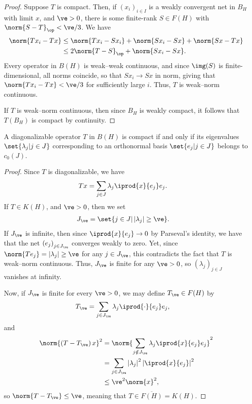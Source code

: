 \documentclass[10pt]{mypackage}
\begin{document}
\begin{proof}
  Suppose $T$ is compact. Then, if $\left( x_{i} \right)_{i\in I}$ is a weakly convergent net in $B_H$ with limit $x$, and $\ve > 0$, there is some finite-rank $S\in F(H)$ with $\norm{S-T}_{\op} < \ve/3$. We have
  \begin{align*}
    \norm{Tx_i - Tx} &\leq \norm{Tx_i - Sx_i} + \norm{Sx_i - Sx} + \norm{Sx - Tx}\\
                     &\leq 2\norm{T-S}_{\op} + \norm{Sx_i - Sx}.
  \end{align*}
  Every operator in $B(H)$ is weak--weak continuous, and since $\img(S)$ is finite-dimensional, all norms coincide, so that $Sx_i \rightarrow Sx$ in norm, giving that $\norm{Tx_i -Tx} < \ve/3$ for sufficiently large $i$. Thus, $T$ is weak--norm continuous.

  If $T$ is weak--norm continuous, then since $B_H$ is weakly compact, it follows that $T\left(B_H\right)$ is compact by continuity.
\end{proof}
\begin{lemma}
  A diagonalizable operator $T$ in $B(H)$ is compact if and only if its eigenvalues $\set{\lambda_j | j\in J}$ corresponding to an orthonormal basis $\set{e_j | j\in J}$ belongs to $c_0(J)$.
\end{lemma}
\begin{proof}
  Since $T$ is diagonalizable, we have
  \begin{align*}
    Tx &= \sum_{j\in J}\lambda_j \iprod{x}{e_j}e_j.
  \end{align*}
  If $T\in K(H)$, and $\ve > 0$, then we set
  \begin{align*}
    J_{\ve} &= \set{j\in J | \left\vert \lambda_j \right\vert \geq \ve}.
  \end{align*}
  If $J_{\ve}$ is infinite, then since $ \iprod{x}{e_j} \rightarrow 0 $ by Parseval's identity, we have that the net $\left( e_j \right)_{j\in J_{\ve}}$ converges weakly to zero. Yet, since $\norm{Te_j} = \left\vert \lambda_j \right\vert \geq \ve$ for any $j\in J_{\ve}$, this contradicts the fact that $T$ is weak--norm continuous. Thus, $J_{\ve}$ is finite for any $\ve > 0$, so $\left( \lambda_j \right)_{j\in J}$ vanishes at infinity.

  Now, if $J_{\ve}$ is finite for every $\ve > 0$, we may define $T_{\ve}\in F(H)$ by
  \begin{align*}
    T_{\ve} &= \sum_{j\in J_{\ve}}\lambda_j \iprod{\cdot}{e_j}e_j,
  \end{align*}
  and
  \begin{align*}
    \norm{\left( T-T_{\ve} \right)x}^2 &= \norm{\sum_{j\notin J_{\ve}} \lambda_j \iprod{x}{e_j}e_j}^2\\
                                       &= \sum_{j\in J_{\ve}} \left\vert \lambda_j \right\vert^2 \left\vert \iprod{x}{e_j} \right\vert^2\\
                                       &\leq \ve^2\norm{x}^2,
  \end{align*}
  so $\norm{T-T_{\ve}} \leq \ve$, meaning that $T\in \overline{F(H)} = K(H)$.
\end{proof}
\end{document}
